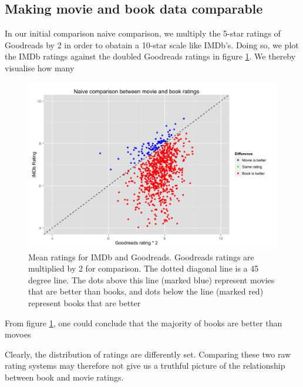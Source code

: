\documentclass[12pt]{article}
\begin{document}
\subsection{Making movie and book data comparable}
In our initial comparison naive comparison, we multiply the 5-star ratings of Goodreads by 2 in order to obatain a 10-star scale like IMDb's. Doing so, we plot the IMDb ratings against the doubled Goodreads ratings in figure \ref{fig:naive}. We thereby visualise how many 
\begin{figure}[H]
\centering
\includegraphics[scale=0.1]{naive}
\caption{\footnotesize Mean ratings for IMDb and Goodreads. Goodreads ratings are multiplied by 2 for comparison. The dotted diagonal line is a 45 degree line. The dots above this line (marked blue) represent movies that are better than  books, and dots below the line (marked red) represent books that are better}
\label{fig:naive}
\end{figure}
From figure \ref{fig:naive}, one could conclude that the majority of books are better than movoes

Clearly, the distribution of ratings are differently set. Comparing these two raw rating systems may therefore not give us a truthful picture of the relationship between book and movie ratings. 
\end{document}
